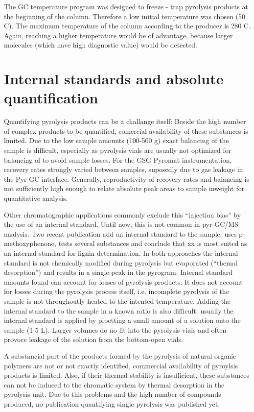 The GC temperature program was designed to freeze - trap pyrolysis products at the beginning of the column. Therefore a low initial temperature was chosen (50 \textdegree C). The maximum temperature of the column according to the producer is 280 \textdegree C. Again, reaching a higher temperature would be of advantage, because larger molecules (which have high diagnostic value) would be detected.

\section{Internal standards and absolute quantification}

Quantifying pyrolysis products can be a challange itself: Beside the high number of complex products to be quantified, comercial availability of these substances is limited. Due to the low sample amounts (100-500 \textmu g) exact balancing of the sample is difficult, especially as pyrolysis vials are usually not optimized for balancing of to avoid sample losses. For the GSG Pyromat instrumentation, recovery rates strongly varied between samples, suposedly due to gas leakage in the Pyr-GC interface. Generally, reproductivity of recovery rates and balancing is not sufficiently high enough to relate absolute peak areas to sample inweight for quantitative analysis. 

Other chromatographic applications commonly exclude this ``injection bias'' by the use of an internal standard. Until now, this is not common in pyr-GC/MS analysis. Two recent publication add an internal standard to the sample: \cite{Steinbeiss2006} uses p-methoxyphenone, \cite{Bocchini1997} tests several substances and conclude that xx is most suited as an internal standard for lignin determination. In both approaches the internal standard is not chemically modified during pyrolysis but evaporated (``themal desorption'') and results in a single peak in the pyrogram. Internal standard amounts found can account for losses of pyrolysis products. It does not account for losses during the pyrolysis process itself, i.e. incomplete pyrolysis of the sample is not throughoutly heated to the intented temperature. Adding the internal standard to the sample in a known ratio is also difficult: usually the internal standard is applied by pipetting a small amount of a solution onto the sample (1-5 \textmu L). Larger volumes do no fit into the pyrolysis vials and often provoce leakage of the solution from the bottom-open vials.

A substancial part of the products formed by the pyrolysis of natural organic polymers are not or not exactly identified, commercial availability of pyroylsis products is limited. Also, if their thermal stability is insufficient, these substances can not be induced to the chromatic system by thermal desorption in the pyrolysis unit. Due to this problems and the high number of compounds produced, no publication quantifying single pyrolysis was published yet.

